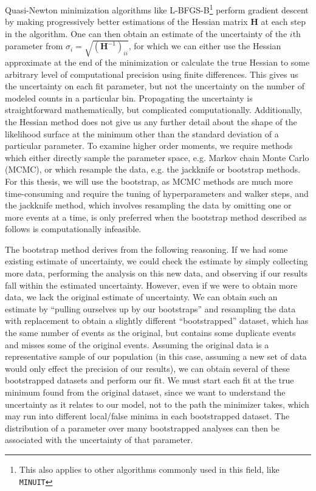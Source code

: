 Quasi-Newton minimization algorithms like L-BFGS-B\footnote{This also applies to other algorithms commonly used in this field, like \texttt{MINUIT}} perform gradient descent by making progressively better estimations of the Hessian matrix $\mathbf{H}$ at each step in the algorithm. One can then obtain an estimate of the uncertainty of the $i$th parameter from $\sigma_i = \sqrt{(\mathbf{H}^{-1})_{ii}}$, for which we can either use the Hessian approximate at the end of the minimization or calculate the true Hessian to some arbitrary level of computational precision using finite differences. This gives us the uncertainty on each fit parameter, but not the uncertainty on the number of modeled counts in a particular bin. Propagating the uncertainty is straightforward mathematically, but complicated computationally. Additionally, the Hessian method does not give us any further detail about the shape of the likelihood surface at the minimum other than the standard deviation of a particular parameter. To examine higher order moments, we require methods which either directly sample the parameter space, e.g. Markov chain Monte Carlo (MCMC), or which resample the data, e.g. the jackknife or bootstrap methods. For this thesis, we will use the bootstrap, as MCMC methods are much more time-consuming and require the tuning of hyperparameters and walker steps, and the jackknife method, which involves resampling the data by omitting one or more events at a time, is only preferred when the bootstrap method described as follows is computationally infeasible.

The bootstrap method derives from the following reasoning. If we had some existing estimate of uncertainty, we could check the estimate by simply collecting more data, performing the analysis on this new data, and observing if our results fall within the estimated uncertainty. However, even if we were to obtain more data, we lack the original estimate of uncertainty. We can obtain such an estimate by ``pulling ourselves up by our bootstraps'' and resampling the data with replacement to obtain a slightly different ``bootstrapped'' dataset, which has the same number of events as the original, but contains some duplicate events and misses some of the original events. Assuming the original data is a representative sample of our population (in this case, assuming a new set of data would only effect the precision of our results), we can obtain several of these bootstrapped datasets and perform our fit. We must start each fit at the true minimum found from the original dataset, since we want to understand the uncertainty as it relates to our model, not to the path the minimizer takes, which may run into different local/false minima in each bootstrapped dataset. The distribution of a parameter over many bootstrapped analyses can then be associated with the uncertainty of that parameter.

